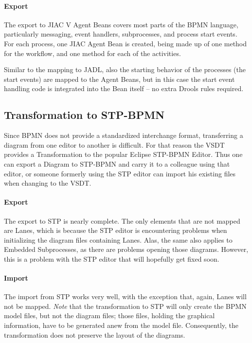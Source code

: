 \paragraph{Export}
The export to JIAC V Agent Beans covers most parts of the BPMN language,
particularly messaging, event handlers, subprocesses, and process start events.
For each process, one JIAC Agent Bean is created, being made up of one method for
the workflow, and one method for each of the activities.

Similar to the mapping to JADL, also the starting behavior of the processes (the
start events) are mapped to the Agent Beans, but in this case the start event
handling code is integrated into the Bean itself -- no extra Drools rules required.




\subsection{Transformation to STP-BPMN}

Since BPMN does not provide a standardized interchange format, transferring a
diagram from one editor to another is difficult.  For that reason the VSDT provides
a Transformation to the popular Eclipse STP-BPMN Editor.  Thus one can export a
Diagram to STP-BPMN and carry it to a colleague using that editor, or someone
formerly using the STP editor can import his existing files when changing to the
VSDT.

\paragraph{Export}
The export to STP is nearly complete.  The only elements that are not mapped are
Lanes, which is because the STP editor is encountering problems when initializing
the diagram files containing Lanes.  Alas, the same also applies to Embedded
Subprocesses, as there are problems opening those diagrams.  However, this is a
problem with the STP editor that will hopefully get fixed soon.

\paragraph{Import}
The import from STP works very well, with the exception that, again, Lanes will
not be mapped. \emph{Note} that the transformation to STP will only create the
BPMN model files, but not the diagram files; those files, holding the graphical
information, have to be generated anew from the model file.  Consequently, the
transformation does not preserve the layout of the diagrams.

